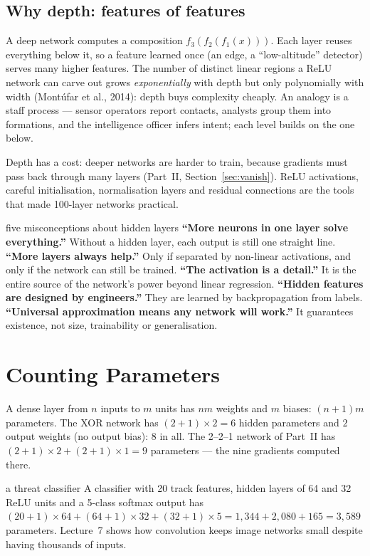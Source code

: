 \documentclass[11pt]{article}
\begin{document}
\subsection{Why depth: features of features}
A deep network computes a composition $f_3(f_2(f_1(x)))$. Each layer reuses everything below it, so a feature learned once (an edge, a ``low-altitude'' detector) serves many higher features. The number of distinct linear regions a ReLU network can carve out grows \emph{exponentially} with depth but only polynomially with width (Mont\'ufar et al., 2014): depth buys complexity cheaply. An analogy is a staff process --- sensor operators report contacts, analysts group them into formations, and the intelligence officer infers intent; each level builds on the one below.

Depth has a cost: deeper networks are harder to train, because gradients must pass back through many layers (Part~II, Section~\ref{sec:vanish}). ReLU activations, careful initialisation, normalisation layers and residual connections are the tools that made 100-layer networks practical.

\begin{pitfall}{five misconceptions about hidden layers}
\textbf{``More neurons in one layer solve everything.''} Without a hidden layer, each output is still one straight line.
\textbf{``More layers always help.''} Only if separated by non-linear activations, and only if the network can still be trained.
\textbf{``The activation is a detail.''} It is the entire source of the network's power beyond linear regression.
\textbf{``Hidden features are designed by engineers.''} They are learned by backpropagation from labels.
\textbf{``Universal approximation means any network will work.''} It guarantees existence, not size, trainability or generalisation.
\end{pitfall}

\section{Counting Parameters}
A dense layer from $n$ inputs to $m$ units has $nm$ weights and $m$ biases: $(n+1)m$ parameters. The XOR network has $(2+1)\times2=6$ hidden parameters and $2$ output weights (no output bias): 8 in all. The 2--2--1 network of Part~II has $(2+1)\times2+(2+1)\times1=9$ parameters --- the nine gradients computed there.
\begin{example}{a threat classifier}
A classifier with 20 track features, hidden layers of 64 and 32 ReLU units and a 5-class softmax output has $(20+1)\times64+(64+1)\times32+(32+1)\times5=1{,}344+2{,}080+165=3{,}589$ parameters. Lecture~7 shows how convolution keeps image networks small despite having thousands of inputs.
\end{example}
\end{document}
